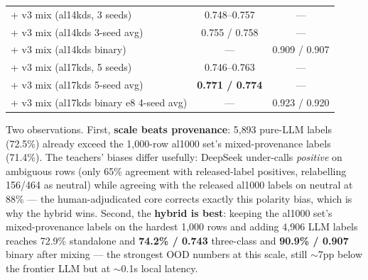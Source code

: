 \documentclass[11pt,a4paper]{article}
\begin{document}
\begin{table}[H]
\begin{tabular}{lcc}
+ v3 mix (al14kds, 3 seeds)          & 0.748--0.757 & --- \\
+ v3 mix (al14kds 3-seed avg)        & 0.755 / 0.758 & --- \\
+ v3 mix (al14kds binary)            & --- & 0.909 / 0.907 \\
+ v3 mix (al17kds, 5 seeds)          & 0.746--0.763 & --- \\
+ v3 mix (al17kds 5-seed avg)        & \textbf{0.771 / 0.774} & --- \\
+ v3 mix (al17kds binary e8 4-seed avg) & --- & 0.923 / 0.920 \\
\bottomrule
\end{tabular}
\end{table}

Two observations. First, \textbf{scale beats provenance}: 5{,}893
pure-LLM labels (72.5\%) already exceed the 1{,}000-row al1000 set's
mixed-provenance labels (71.4\%). The teachers' biases differ usefully: DeepSeek
under-calls \emph{positive} on ambiguous rows (only 65\% agreement
with released-label positives, relabelling 156/464 as neutral) while agreeing
with the released al1000 labels on neutral at 88\% --- the
human-adjudicated core corrects exactly
this polarity bias, which is why the hybrid wins. Second, the \textbf{hybrid is best}: keeping the al1000 set's
mixed-provenance labels on the hardest 1{,}000 rows and adding 4{,}906 LLM
labels reaches 72.9\% standalone and \textbf{74.2\% / 0.743} three-class
and \textbf{90.9\% / 0.907} binary after mixing --- the strongest OOD
numbers at this scale, still $\sim$7pp below the frontier LLM but at
$\sim$0.1s local latency.
\end{document}

